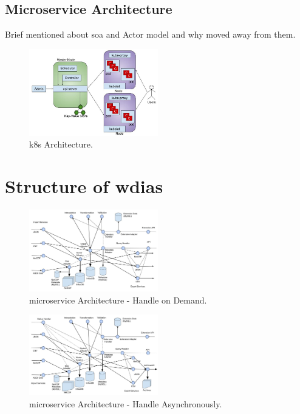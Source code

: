 \documentclass[conference]{IEEEtran}
\begin{document}
\subsection{Microservice Architecture}
Brief mentioned about soa and Actor model and why moved away from them.
\begin{figure}[htbp]
\centerline{\includegraphics[width=0.5\textwidth]{method/microservice/k8s_architecture_v3.jpg}}
\caption{\acrfull{k8s} Architecture.}
\label{fi:k8s_architecture}
\end{figure}

\section{Structure of \acrshort{wdias}}
\begin{figure}[htbp]
\centerline{\includegraphics[width=0.5\textwidth]{method/microservice/microservice_architecture-handle_on_demand-v3.jpg}}
\caption{microservice Architecture - Handle on Demand.}
\label{fi:microservice_architecture_on_demand}
\end{figure}

\begin{figure}[htbp]
\centerline{\includegraphics[width=0.5\textwidth]{method/microservice/microservice_architecture-handle_on_async-v3.jpg}}
\caption{microservice Architecture - Handle Asynchronously.}
\label{fi:microservice_architecture_async}
\end{figure}
\end{document}
